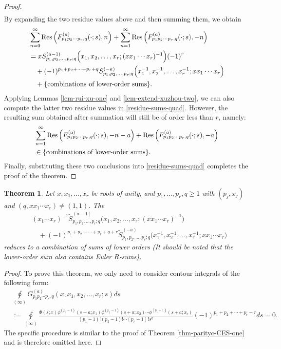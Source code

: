 \documentclass[11pt]{article}
\newcommand\Res{{\rm Res}}
\theoremstyle{plain}
\newtheorem{thm}{Theorem}[section]
\theoremstyle{definition}
\begin{document}
\begin{proof}
\begin{align*}
\end{align*}
By expanding the two residue values above and then summing them, we obtain
\begin{align*}
&\sum_{n=0}^\infty \Res\left(F^{(a)}_{p_1p_2\cdots p_r,q}(\cdot;s),n\right)+\sum_{n=1}^\infty \Res\left(F^{(a)}_{p_1p_2\cdots p_r,q}(\cdot;s),-n\right)\\
&=x S_{p_1,p_2,\ldots,p_r;q}^{(a-1)}\Big(x_1,x_2,\ldots,x_r;(xx_1\cdots x_r)^{-1}\Big)(-1)^r\\&\quad+(-1)^{p_1+p_2+\cdots+p_r+q}S_{p_1,p_2,\ldots,p_r;q}^{(-a)}\Big(x_1^{-1},x_2^{-1},\ldots,x_r^{-1};xx_1\cdots x_r\Big)\\
&\quad+\{\text{combinations of lower-order sums}\}.
\end{align*}
Applying Lemmas \ref{lem-rui-xu-one} and \ref{lem-extend-xuzhou-two}, we can also compute the latter two residue values in \eqref{residue-sums-quad}. However, the resulting sum obtained after summation will still be of order less than $r$, namely:
\begin{align*}
&\sum_{n=1}^\infty\Res\left(F^{(a)}_{p_1p_2\cdots p_r,q}(\cdot;s),-n-a\right)+\Res\left(F^{(a)}_{p_1p_2\cdots p_r,q}(\cdot;s),-a\right)\\
&\in \{\text{combinations of lower-order sums}\}.
\end{align*}
Finally, substituting these two conclusions into \eqref{residue-sums-quad} completes the proof of the theorem.
\end{proof}

\begin{thm}\label{thm-parityc-CES-two} Let $x,x_1,\ldots,x_r$ be roots of unity, and $p_1,\ldots,p_r,q\geq 1$ with $(p_j,x_j) $ and $ (q,xx_1\cdots x_r)\neq (1,1)$. The
\begin{align*}
&(x_1\cdots x_r)^{-1}\tilde{S}_{p_1,p_2,\ldots,p_r;q}^{(a-1)}\Big(x_1,x_2,\ldots,x_r;(xx_1\cdots x_r)^{-1}\Big)\\&\quad+(-1)^{p_1+p_2+\cdots+p_r+q+r}\tilde{S}_{p_1,p_2,\ldots,p_r;q}^{(-a)}\Big(x_1^{-1},x_2^{-1},\ldots,x_r^{-1};xx_1\cdots x_r\Big)
\end{align*}
reduces to a combination of sums of lower orders (It should be noted that the lower-order sum also contains Euler $R$-sums).
\end{thm}
\begin{proof}
To prove this theorem, we only need to consider contour integrals of the following form:
\begin{align*}
&\oint\limits_{\left( \infty  \right)}G^{(a)}_{p_1p_2\cdots p_r,q}(x,x_1,x_2,\ldots,x_r;s)ds\\
&:= \oint\limits_{\left( \infty  \right)}\frac{\Phi(s;x)\phi^{(p_1-1)}(s+a;x_1)\phi^{(p_2-1)}(s+a;x_2)\cdots\phi^{(p_r-1)}(s+a;x_r)}{(p_1-1)!(p_2-1)!\cdots (p_r-1)!s^q} (-1)^{p_1+p_2+\cdots+p_r-r}ds=0.
\end{align*}
The specific procedure is similar to the proof of Theorem \ref{thm-parityc-CES-one} and is therefore omitted here.
\end{proof}
\end{document}
